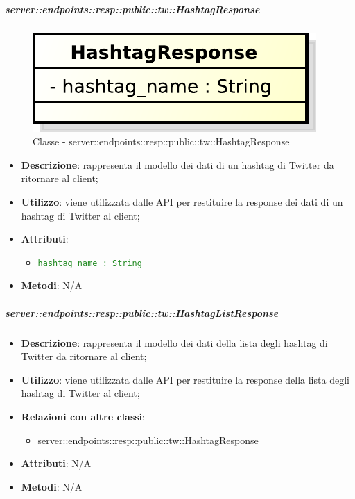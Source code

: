     \subparagraph{server::endpoints::resp::public::tw::HashtagResponse} %
    \label{subp:bdsm_app_server_endpoints_resp_public_tw_hashtagresponse}
  \begin{figure}[!htbp]
    \centering
    \centerline{\includegraphics[scale=0.6]{./images/server/classes/endpoints/tw/hashtag_response.pdf}}
    \caption{Classe - server::endpoints::resp::public::tw::HashtagResponse}
  \end{figure}
    \begin{itemize}
      \item \textbf{Descrizione}: rappresenta il modello dei dati di un hashtag di Twitter da ritornare al client;
      \item \textbf{Utilizzo}: viene utilizzata dalle API per restituire la response dei dati di un hashtag di Twitter al client;

    \item \textbf{Attributi}:
      \begin{itemize}
        \item \textcolor{forestgreen}{\texttt{hashtag\_name : String}}
      \end{itemize}
    \item \textbf{Metodi}: N/A
    \end{itemize}

    \subparagraph{server::endpoints::resp::public::tw::HashtagListResponse} %
    \label{subp:bdsm_app_server_endpoints_resp_public_tw_hashtaglistresponse}
    \begin{itemize}
      \item \textbf{Descrizione}: rappresenta il modello dei dati della lista degli hashtag di Twitter da ritornare al client;
      \item \textbf{Utilizzo}: viene utilizzata dalle API per restituire la response della lista degli hashtag di Twitter al client;
      \item \textbf{Relazioni con altre classi}:
        \begin{itemize}
          \item server::endpoints::resp::public::tw::HashtagResponse
        \end{itemize}
    \item \textbf{Attributi}: N/A
    \item \textbf{Metodi}: N/A
      \end{itemize}


